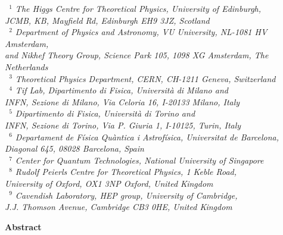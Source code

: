 \documentclass[11pt]{article}
\numberwithin{equation}{section}
\numberwithin{figure}{section}
\numberwithin{table}{section}
\begin{document}
\begin{center}
\vspace{0.5cm}
{\it \small ~$^1$ The Higgs Centre for Theoretical Physics, University of Edinburgh,\\
  JCMB, KB, Mayfield Rd, Edinburgh EH9 3JZ, Scotland\\
~$^2$ Department of Physics and Astronomy, VU University, NL-1081 HV Amsterdam,\\
and Nikhef Theory Group, Science Park 105, 1098 XG Amsterdam, The Netherlands\\
  ~$^3$ Theoretical Physics Department, CERN, CH-1211 Geneva, Switzerland\\
~$^4$ Tif Lab, Dipartimento di Fisica, Universit\`a di Milano and\\
INFN, Sezione di Milano, Via Celoria 16, I-20133 Milano, Italy\\
~$^5$ Dipartimento di Fisica, Universit\`a
di Torino and\\ INFN, Sezione di Torino,
Via P. Giuria 1, I-10125, Turin, Italy\\
~$^6$
Departament de F\'isica Qu\`antica i Astrof\'isica, Universitat de Barcelona,\\ Diagonal 645, 08028 Barcelona, Spain\\
~$^7$ Center for Quantum Technologies, National University of Singapore\\
  ~$^8$ Rudolf Peierls Centre for Theoretical Physics, 1 Keble
Road,\\ University of Oxford, OX1 3NP Oxford, United Kingdom\\
~$^9$ Cavendish Laboratory, HEP group,
University of Cambridge,\\ J.J. Thomson Avenue,
Cambridge CB3 0HE, United Kingdom
}
\end{center}

{\bf \large Abstract}
\end{document}
